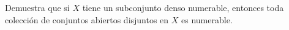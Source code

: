   \item Demuestra que si $X$ tiene un subconjunto denso numerable, entonces toda colección de conjuntos abiertos disjuntos en $X$ es numerable.

 